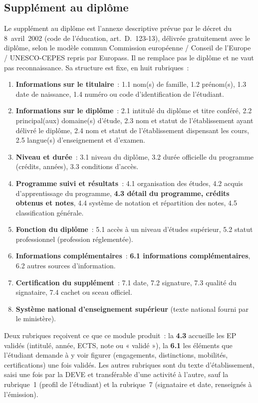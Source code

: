 \documentclass[11pt,a4paper]{article}
\begin{document}
\subsection{Supplément au diplôme}

Le supplément au diplôme est l'annexe descriptive prévue par le décret du 8~avril~2002
(code de l'éducation, art.~D.~123-13), délivrée gratuitement avec le diplôme, selon le
modèle commun Commission européenne / Conseil de l'Europe / UNESCO-CEPES repris par
Europass. Il ne remplace pas le diplôme et ne vaut pas reconnaissance. Sa structure est
fixe, en huit rubriques~:
\begin{enumerate}
  \item \textbf{Informations sur le titulaire}~: 1.1 nom(s) de famille, 1.2 prénom(s),
    1.3 date de naissance, 1.4 numéro ou code d'identification de l'étudiant.
  \item \textbf{Informations sur le diplôme}~: 2.1 intitulé du diplôme et titre conféré,
    2.2 principal(aux) domaine(s) d'étude, 2.3 nom et statut de l'établissement ayant
    délivré le diplôme, 2.4 nom et statut de l'établissement dispensant les cours,
    2.5 langue(s) d'enseignement et d'examen.
  \item \textbf{Niveau et durée}~: 3.1 niveau du diplôme, 3.2 durée officielle du
    programme (crédits, années), 3.3 conditions d'accès.
  \item \textbf{Programme suivi et résultats}~: 4.1 organisation des études, 4.2 acquis
    d'apprentissage du programme, \textbf{4.3 détail du programme, crédits obtenus et
    notes}, 4.4 système de notation et répartition des notes, 4.5 classification générale.
  \item \textbf{Fonction du diplôme}~: 5.1 accès à un niveau d'études supérieur,
    5.2 statut professionnel (profession réglementée).
  \item \textbf{Informations complémentaires}~: \textbf{6.1 informations complémentaires},
    6.2 autres sources d'information.
  \item \textbf{Certification du supplément}~: 7.1 date, 7.2 signature, 7.3 qualité du
    signataire, 7.4 cachet ou sceau officiel.
  \item \textbf{Système national d'enseignement supérieur} (texte national fourni par le
    ministère).
\end{enumerate}
Deux rubriques reçoivent ce que ce module produit~: la \textbf{4.3} accueille les EP
validés (intitulé, année, ECTS, note ou « validé »), la \textbf{6.1} les éléments que
l'étudiant demande à y voir figurer (engagements, distinctions, mobilités, certifications)
une fois validés. Les autres rubriques sont du texte d'établissement, saisi une fois par la
DEVE et transférable d'une activité à l'autre, sauf la rubrique~1 (profil de l'étudiant)
et la rubrique~7 (signataire et date, renseignés à l'émission).
\end{document}
